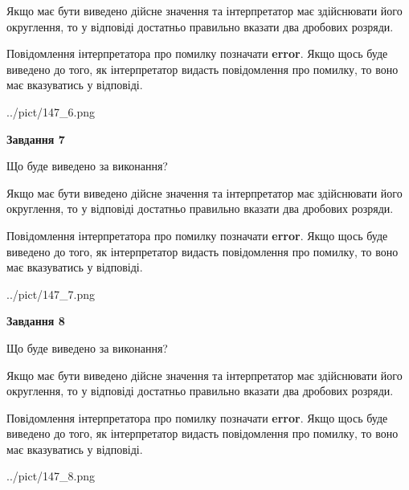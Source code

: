 \documentclass[12pt, ukrainian]{article}
\begin{document}
{\begin {Large}
Якщо має бути виведено дійсне значення та інтерпретатор має здійснювати його округлення, 
то у відповіді достатньо правильно вказати два дробових розряди.

Повідомлення інтерпретатора про помилку позначати \textbf{error}.
Якщо щось буде виведено до того, як інтерпретатор видасть повідомлення про помилку, 
то воно має вказуватись у відповіді. \par

\begin{center}
	{../pict/147_6.png}
\end{center}
\newpage

{\begin {center}\textbf{Завдання 7}\end {center}}\par
Що буде виведено за виконання? \par

Якщо має бути виведено дійсне значення та інтерпретатор має здійснювати його округлення, 
то у відповіді достатньо правильно вказати два дробових розряди.

Повідомлення інтерпретатора про помилку позначати \textbf{error}.
Якщо щось буде виведено до того, як інтерпретатор видасть повідомлення про помилку, 
то воно має вказуватись у відповіді. \par

\begin{center}
	{../pict/147_7.png}
\end{center}
\newpage

{\begin {center}\textbf{Завдання 8}\end {center}}\par
Що буде виведено за виконання? \par

Якщо має бути виведено дійсне значення та інтерпретатор має здійснювати його округлення, 
то у відповіді достатньо правильно вказати два дробових розряди.

Повідомлення інтерпретатора про помилку позначати \textbf{error}.
Якщо щось буде виведено до того, як інтерпретатор видасть повідомлення про помилку, 
то воно має вказуватись у відповіді. \par

\begin{center}
	{../pict/147_8.png}
\end{center}
\newpage


\end{Large}}
\end{document}
